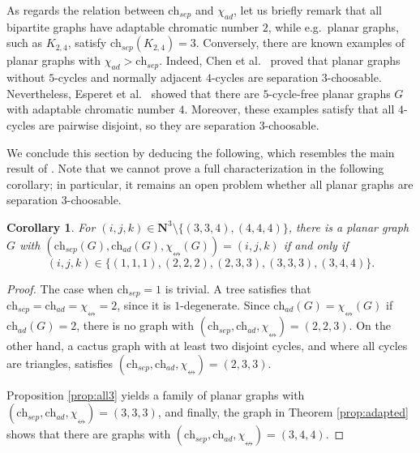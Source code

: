 \documentclass[12pt]{article}
\newtheorem{corollary}[theorem]{Corollary}
\newcommand{\single}{\chi_{\nleftrightarrow}}
\newcommand{\ch}{\mathrm{ch}}
\begin{document}
As regards the relation between $\ch_{sep}$ and $\chi_{ad}$,  let us briefly remark that
all bipartite graphs have adaptable chromatic number $2$, while e.g.\ planar graphs,
such as $K_{2,4}$, satisfy
$\ch_{sep}(K_{2,4}) = 3$. Conversely, there are known examples of 
planar graphs with $\chi_{ad} > \ch_{sep}$.
Indeed, Chen et al.\ \cite{ChenLihWang} proved that planar graphs without
$5$-cycles and normally adjacent $4$-cycles are separation $3$-choosable.
Nevertheless, Esperet et al.\ \cite{EsperetMontassierZhu} showed that there are $5$-cycle-free
planar graphs $G$ with adaptable chromatic number $4$. Moreover, these examples satisfy that all $4$-cycles
are pairwise disjoint, so they are separation $3$-choosable.

\bigskip


	We conclude this section by deducing the following, which resembles
	the main result of \cite{Abe}. Note that we cannot prove a full characterization
	in the following corollary; in particular, it remains 
	an open problem whether  all planar graphs are separation $3$-choosable.

\begin{corollary}
\label{cor:planar}
	For $(i,j,k) \in \mathbf{N}^3 \setminus \{(3,3,4),(4,4,4)\}$,
	there is a planar graph $G$ with 
	$(\ch_{sep}(G), \ch_{ad}(G), \single(G)) = (i,j,k)$ 
	if and only if
	$$(i,j,k) \in \{(1,1,1), (2,2,2), (2,3,3), (3,3,3), (3,4,4)\}.$$
\end{corollary}

\begin{proof}
The case when $\ch_{sep}=1$ is trivial.
A tree satisfies that $\ch_{sep} = \ch_{ad} = \single =2$, since it is
$1$-degenerate. Since $\ch_{ad}(G) = \single(G)$ if $\ch_{ad}(G)=2$,
there is no graph with $(\ch_{sep}, \ch_{ad}, \single) =(2,2,3)$.
On the other hand, a cactus graph with at least two disjoint cycles,
and where all cycles are triangles,
satisfies $(\ch_{sep}, \ch_{ad}, \single)=(2,3,3)$.

Proposition \ref{prop:all3} yields a family of planar graphs with
 $(\ch_{sep}, \ch_{ad}, \single)=(3,3,3)$, 
and
finally, the graph in Theorem \ref{prop:adapted} shows
that there are graphs with $(\ch_{sep}, \ch_{ad}, \single)=(3,4,4)$.
\end{proof}











\end{document}
